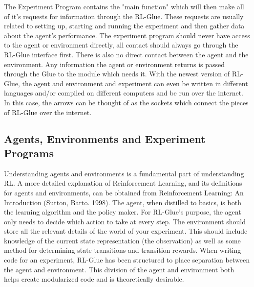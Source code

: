 \documentclass[11pt]{article}
\begin{document}

The Experiment Program contains the "main function" which will then make all of it's requests for information through the RL-Glue. These requests are usually related to setting up, starting and running the experiment and then gather data about the agent's performance. The experiment program should never have access to the agent or environment directly, all contact should always go through the RL-Glue interface first.  There is also no direct contact between the agent and the environment. Any information the agent or environment returns is passed through the Glue to the module which needs it.  With the newest version of RL-Glue, the agent and environment and experiment can even be written in different languages and/or compiled on different computers and be run over the internet. In this case, the arrows can be thought of as the sockets which connect the pieces of RL-Glue over the internet.



\subsection{Agents, Environments and Experiment Programs}
Understanding agents and environments is a fundamental part of understanding RL. A more detailed explanation of Reinforcement Learning, and its definitions for agents and environments, can be obtained from Reinforcement Learning: An Introduction (Sutton, Barto. 1998).  The agent, when distilled to basics, is both the learning algorithm and the policy maker. For RL-Glue's purpose, the agent only needs to decide which action to take at every step. The environment should store all the relevant details of the world of your experiment. This should include knowledge of the current state representation (the observation) as well as some method for determining state transitions and transition rewards. When writing code for an experiment, RL-Glue has been structured to place separation between the agent and environment.  This division  of the agent and environment both helps create modularized code and is theoretically desirable.
\end{document}
